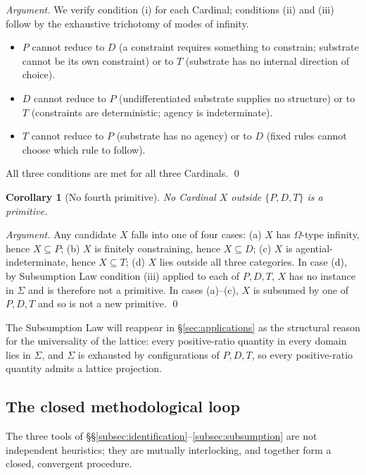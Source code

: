 \documentclass[11pt,a4paper]{article}
\newtheorem{corollary}[theorem]{Corollary}
\theoremstyle{definition}
\theoremstyle{remark}
\begin{document}
\begin{proof}[Argument]
We verify condition (i) for each Cardinal; conditions (ii) and (iii) follow by the exhaustive trichotomy of modes of infinity.
\begin{itemize}[leftmargin=*]
\item $P$ cannot reduce to $D$ (a constraint requires something to constrain; substrate cannot be its own constraint) or to $T$ (substrate has no internal direction of choice).
\item $D$ cannot reduce to $P$ (undifferentiated substrate supplies no structure) or to $T$ (constraints are deterministic; agency is indeterminate).
\item $T$ cannot reduce to $P$ (substrate has no agency) or to $D$ (fixed rules cannot choose which rule to follow).
\end{itemize}
All three conditions are met for all three Cardinals. \qed
\end{proof}

\begin{corollary}[No fourth primitive]\label{cor:nofourth}
No Cardinal $X$ outside $\{P,D,T\}$ is a primitive.
\end{corollary}

\begin{proof}[Argument]
Any candidate $X$ falls into one of four cases: (a) $X$ has $\Omega$-type infinity, hence $X \subseteq P$; (b) $X$ is finitely constraining, hence $X \subseteq D$; (c) $X$ is agential-indeterminate, hence $X \subseteq T$; (d) $X$ lies outside all three categories. In case (d), by Subsumption Law condition (iii) applied to each of $P,D,T$, $X$ has no instance in $\Sigma$ and is therefore not a primitive. In cases (a)--(c), $X$ is subsumed by one of $P,D,T$ and so is not a new primitive. \qed
\end{proof}

The Subsumption Law will reappear in \S\ref{sec:applications} as the structural reason for the universality of the lattice: every positive-ratio quantity in every domain lies in $\Sigma$, and $\Sigma$ is exhausted by configurations of $P,D,T$, so every positive-ratio quantity admits a lattice projection.

\subsection{The closed methodological loop}\label{subsec:loop}

The three tools of \S\S\ref{subsec:identification}--\ref{subsec:subsumption} are not independent heuristics; they are mutually interlocking, and together form a closed, convergent procedure.
\end{document}
